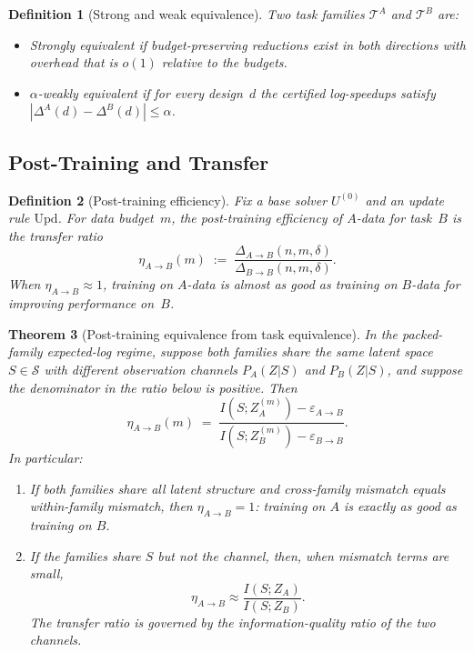 \documentclass[10pt]{article}
\theoremstyle{paperplain}
\newtheorem{theorem}{Theorem}[section]
\theoremstyle{paperdefinition}
\newtheorem{definition}[theorem]{Definition}
\theoremstyle{paperremark}
\newcommand{\cS}{\mathcal{S}}
\newcommand{\cT}{\mathcal{T}}
\begin{document}
\begin{definition}[Strong and weak equivalence]
\label{def:equivalence}
Two task families $\cT^A$ and $\cT^B$ are:
\begin{itemize}
\item \emph{Strongly equivalent} if budget-preserving reductions exist in both directions with overhead that is $o(1)$ relative to the budgets.
\item \emph{$\alpha$-weakly equivalent} if for every design~$d$ the certified log-speedups satisfy $|\Delta^A(d) - \Delta^B(d)| \le \alpha$.
\end{itemize}
\end{definition}

\subsection{Post-Training and Transfer}
\label{subsec:post-training}

\begin{definition}[Post-training efficiency]
\label{def:post-training-eff}
Fix a base solver $U^{(0)}$ and an update rule $\mathrm{Upd}$.
For data budget~$m$, the \emph{post-training efficiency of $A$-data for task~$B$} is the transfer ratio
\[
\eta_{A \to B}(m) \;:=\; \frac{\Delta_{A \to B}(n,m,\delta)}{\Delta_{B \to B}(n,m,\delta)}.
\]
When $\eta_{A \to B} \approx 1$, training on $A$-data is almost as good as training on $B$-data for improving performance on~$B$.
\end{definition}

\begin{theorem}[Post-training equivalence from task equivalence]
\label{thm:post-training}
In the packed-family expected-log regime, suppose both families share the same latent space $S \in \cS$ with different observation channels $P_A(Z|S)$ and $P_B(Z|S)$, and suppose the denominator in the ratio below is positive.
Then
\begin{equation}
\label{eq:post-training-ratio}
\eta_{A \to B}(m) \;=\; \frac{I(S;Z_A^{(m)}) - \varepsilon_{A \to B}}{I(S;Z_B^{(m)}) - \varepsilon_{B \to B}}.
\end{equation}
In particular:
\begin{enumerate}
\item[\textup{(i)}] If both families share all latent structure and cross-family mismatch equals within-family mismatch, then $\eta_{A \to B} = 1$: training on $A$ is exactly as good as training on $B$.
\item[\textup{(ii)}] If the families share $S$ but not the channel, then, when mismatch terms are small,
\[
\eta_{A \to B} \approx \frac{I(S;Z_A)}{I(S;Z_B)}.
\]
The transfer ratio is governed by the information-quality ratio of the two channels.
\end{enumerate}
\end{theorem}
\end{document}
